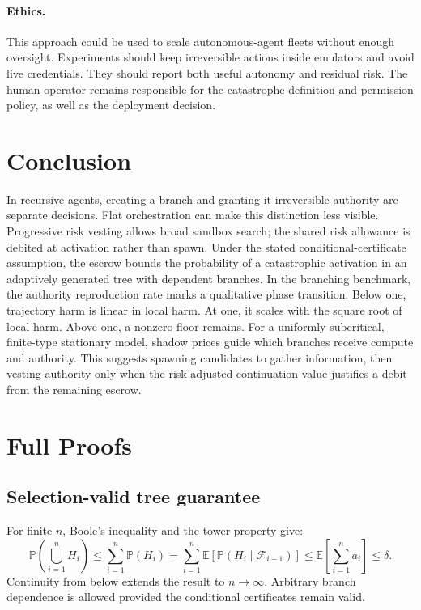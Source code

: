 \documentclass[sigconf,nonacm]{acmart}
\newcommand{\E}{\mathbb{E}}
\newcommand{\Prb}{\mathbb{P}}
\newcommand{\F}{\mathcal{F}}
\begin{document}
\paragraph{Ethics.}
This approach could be used to scale autonomous-agent fleets without enough oversight.
Experiments should keep irreversible actions inside emulators and avoid live credentials.  They
should report both useful autonomy and residual risk.  The human operator remains
responsible for the catastrophe definition and permission policy, as well as the deployment
decision.

\section{Conclusion}

In recursive agents, creating a branch and granting it irreversible authority are separate
decisions.  Flat orchestration can make this distinction less visible.  Progressive risk vesting
allows broad sandbox search; the shared risk allowance is debited at activation rather than spawn.  Under the stated
conditional-certificate assumption, the escrow bounds the probability of a catastrophic
activation in an adaptively generated tree with dependent branches.  In the branching benchmark,
the authority reproduction rate marks a qualitative phase transition.  Below one, trajectory
harm is linear in local harm.  At one, it scales with the square root of local harm.  Above one, a
nonzero floor remains.  For a uniformly subcritical, finite-type stationary model, shadow prices
guide which branches receive compute and authority.  This suggests spawning candidates to gather
information, then vesting authority only when the risk-adjusted continuation value justifies a
debit from the remaining escrow.

\appendix
\section{Full Proofs}

\subsection{Selection-valid tree guarantee}

For finite $n$, Boole's inequality and the tower property give:
\[
 \Prb\!\left(\bigcup_{i=1}^{n}H_i\right)
 \leq\sum_{i=1}^{n}\Prb(H_i)
 =\sum_{i=1}^{n}\E\!\left[\Prb(H_i\mid\F_{i-1})\right]
 \leq\E\!\left[\sum_{i=1}^{n}a_i\right]
 \leq\delta.
\]
Continuity from below extends the result to $n\to\infty$.  Arbitrary branch dependence is allowed
provided the conditional certificates remain valid.
\end{document}
